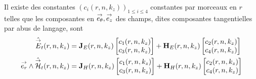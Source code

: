     \begin{prop}
      Il existe des constantes \((c_i(r,n,k_z))_{1\le i\le 4}\) constantes par morceaux en \(r\) telles que les composantes en \({\overset{\rightarrow}{e_\theta}},{\overset{\rightarrow}{e_z}}\) des champs, dites composantes tangentielles par abus de langage, sont
      \begin{subequations}
        \begin{align}
          \hat {{\overset{\rightarrow}{E}}}_t(r,n,k_z) &= \mathbf{J}_{E}(r,n,k_z)
          \begin{bmatrix}
            c_1(r,n,k_z) \\
            c_3(r,n,k_z)
          \end{bmatrix}
          +
          \mathbf{H}_{E}(r,n,k_z)
          \begin{bmatrix}
            c_2(r,n,k_z) \\
            c_4(r,n,k_z)
          \end{bmatrix}
          \label{eq:imp_fourier:cylindre:Et}
          \\
          {\overset{\rightarrow}{e_r}}\wedge\hat {{\overset{\rightarrow}{\mathcal{H}}}}_t(r,n,k_z) &=
          \mathbf{J}_{H}(r,n,k_z)
          \begin{bmatrix}
            c_1(r,n,k_z) \\
            c_3(r,n,k_z)
          \end{bmatrix}
          +
          \mathbf{H}_{H}(r,n,k_z)
          \begin{bmatrix}
            c_2(r,n,k_z) \\
            c_4(r,n,k_z)
          \end{bmatrix}
          \label{eq:imp_fourier:cylindre:Ht}
        \end{align}
      \end{subequations}
    \end{prop}


